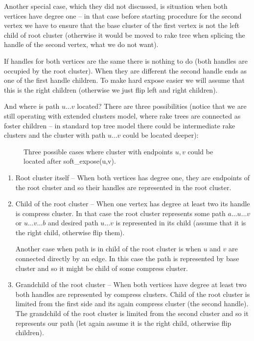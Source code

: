 Another special case, which they did not discussed, is situation when both
vertices have degree one -- in that case before starting procedure for the
second vertex we have to ensure that the base cluster of the first vertex is not
the left child of root cluster (otherwise it would be moved to rake tree when
splicing the handle of the second vertex, what we do not want).

If handles for both vertices are the same there is nothing to do (both handles
are occupied by the root cluster). When they are different the second handle
ends as one of the first handle children. To make hard expose easier we will
assume that this is the right children (otherwise we just flip left and right
children).

And where is path $u\dots v$ located? There are three possibilities (notice that
we are still operating with extended clusters model, where rake trees are
connected as foster children -- in standard top tree model there could be
intermediate rake clusters and the cluster with path $u\dots v$ could be located
deeper):

\begin{figure}[h]
\centering
{}
\caption{Three possible cases where cluster with endpoints $u,v$ could be located
after {\I soft\_expose(u,v)}.}
\end{figure}

\begin{enumerate}

\item Root cluster itself -- When both vertices has degree one, they are endpoints
of the root cluster and so their handles are represented in the root cluster.

\item Child of the root cluster -- When one vertex has degree at least two its
handle is compress cluster. In that case the root cluster represents some path
$a\dots u\dots v$ or $u\dots v\dots b$ and desired path $u\dots v$ is
represented in its child (assume that it is the right child, otherwise flip them).

Another case when path is in child of the root cluster is when $u$ and $v$ are
connected directly by an edge. In this case the path is represented by base cluster
and so it might be child of some compress cluster.

\item Grandchild of the root cluster -- When both vertices have degree at least
two both handles are represented by compress clusters. Child of the root cluster
is limited from the first side and its again compress cluster (the second handle).
The grandchild of the root cluster is limited from the second cluster and so it
represents our path (let again assume it is the right child, otherwise flip
children).

\end{enumerate}

